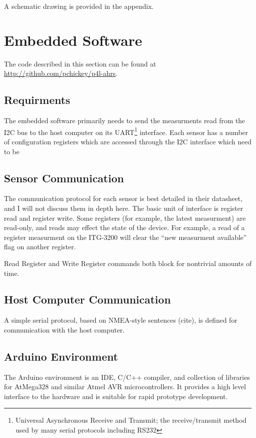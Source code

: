 \documentclass[12pt]{report}
\begin{document}

A schematic drawing is provided in the appendix. %

\section{Embedded Software}
The code described in this section can be found at \url{http://github.com/pchickey/p4l-ahrs}.
\lstset{language=C++}
\subsection{Requirments}
The embedded software primarily needs to send the measurments read from the I2C bus to the host computer on its 
UART\footnote{Universal Asynchronous Receive and Transmit; the receive/transmit method used by many serial protocols including RS232} 
interface. Each sensor has a number of configuration registers which are accessed through the I2C interface which need to be 

\subsection{Sensor Communication}

The communication protocol for each sensor is best detailed in their datasheet, and I will not discuss them in depth here. The basic unit of interface is register read and register write. Some registers (for example, the latest measurment) are read-only, and reads may effect the state of the device. For example, a read of a register measurment on the ITG-3200 will clear the ``new measurment available'' flag on another register.   

Read Register and Write Register commands both block for nontrivial amounts of time. 



\subsection{Host Computer Communication}
A simple serial protocol, based on NMEA-style sentences (cite), is defined for communication with the host computer. 

\subsection{Arduino Environment}
The Arduino environment is an IDE, C/C++ compiler, and collection of libraries for AtMega328 and similar Atmel AVR microcontrollers. It provides a high level interface to the hardware and is suitable for rapid prototype development. 
\end{document}
